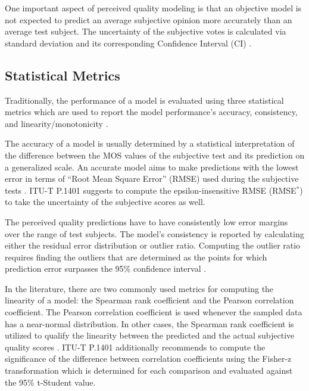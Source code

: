 \documentclass[journal]{IEEEtran}
\begin{document}
One important aspect of perceived quality modeling is that an objective model is not expected to predict an average subjective opinion more accurately than an average test subject. The uncertainty of the subjective votes is calculated via standard deviation and its corresponding Confidence Interval (CI) \cite{itut2012P.1401}.

\vspace{-0.3cm}
\subsection{Statistical Metrics}
\label{subsec:Metrics}

Traditionally, the performance of a model is evaluated using three statistical metrics which are used to report the model performance's accuracy, consistency, and linearity/monotonicity \cite{itut2012P.1401}.

The accuracy of a model is usually determined by a statistical interpretation of the difference between the MOS values of the subjective test and its prediction on a generalized scale. An accurate model aims to make predictions with the lowest error in terms of ``Root Mean Square Error'' (RMSE) used during the subjective tests \cite{itut2012P.1401} \cite{garcia2014parametric}. ITU-T P.1401 suggests to compute the epsilon-insensitive RMSE (RMSE$^*$) to take the uncertainty of the subjective scores as well.

The perceived quality predictions have to have consistently low error margins over the range of test subjects. The model's consistency is reported by calculating either the residual error distribution or outlier ratio. Computing the outlier ratio requires finding the outliers that are determined as the points for which prediction error surpasses the 95\% confidence interval \cite{itut2012P.1401} \cite{garcia2014parametric}.

In the literature, there are two commonly used metrics for computing the linearity of a model: the Spearman rank coefficient and the Pearson correlation coefficient. The Pearson correlation coefficient is used whenever the sampled data has a near-normal distribution. In other cases, the Spearman rank coefficient is utilized to qualify the linearity between the predicted and the actual subjective quality scores \cite{garcia2014parametric}. ITU-T P.1401 additionally recommends to compute the significance of the difference between correlation coefficients using the  Fisher-z transformation which is determined for each comparison and evaluated against the 95\% t-Student value.
\end{document}
